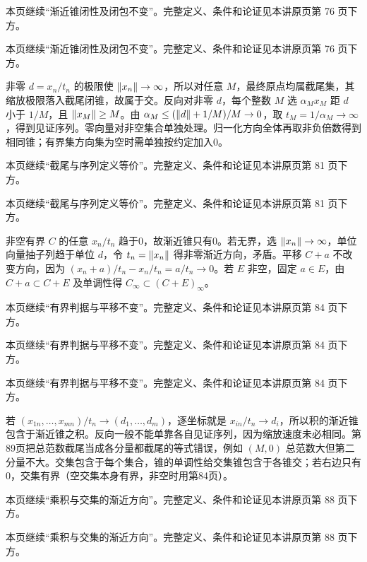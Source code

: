 本页继续“渐近锥闭性及闭包不变”。完整定义、条件和论证见本讲原页第 76 页下方。

本页继续“渐近锥闭性及闭包不变”。完整定义、条件和论证见本讲原页第 76 页下方。

非零 $d=x_n/t_n$ 的极限使 $\left\lVert x_n\right\rVert\to\infty$，所以对任意 $M$，最终原点均属截尾集，其缩放极限落入截尾闭锥，故属于交。反向对非零 $d$，每个整数 $M$ 选 $\alpha_M x_M$ 距 $d$ 小于 $1/M$，且 $\left\lVert x_M\right\rVert\ge M$。由 $\alpha_M\le(\left\lVert d\right\rVert+1/M)/M\to0$，取 $t_M=1/\alpha_M\to\infty$，得到见证序列。零向量对非空集合单独处理。归一化方向全体再取非负倍数得到相同锥；有界集方向集为空时需单独按约定加入0。

本页继续“截尾与序列定义等价”。完整定义、条件和论证见本讲原页第 81 页下方。

本页继续“截尾与序列定义等价”。完整定义、条件和论证见本讲原页第 81 页下方。

非空有界 $C$ 的任意 $x_n/t_n$ 趋于0，故渐近锥只有0。若无界，选 $\left\lVert x_n\right\rVert\to\infty$，单位向量抽子列趋于单位 $d$，令 $t_n=\left\lVert x_n\right\rVert$ 得非零渐近方向，矛盾。平移 $C+a$ 不改变方向，因为 $(x_n+a)/t_n-x_n/t_n=a/t_n\to0$。若 $E$ 非空，固定 $a\in E$，由 $C+a\subset C+E$ 及单调性得 $C_\infty\subset(C+E)_\infty$。

本页继续“有界判据与平移不变”。完整定义、条件和论证见本讲原页第 84 页下方。

本页继续“有界判据与平移不变”。完整定义、条件和论证见本讲原页第 84 页下方。

本页继续“有界判据与平移不变”。完整定义、条件和论证见本讲原页第 84 页下方。

若 $(x_{1n},\ldots,x_{mn})/t_n\to(d_1,\ldots,d_m)$，逐坐标就是 $x_{in}/t_n\to d_i$，所以积的渐近锥包含于渐近锥之积。反向一般不能单靠各自见证序列，因为缩放速度未必相同。第89页把总范数截尾当成各分量都截尾的等式错误，例如 $(M,0)$ 总范数大但第二分量不大。交集包含于每个集合，锥的单调性给交集锥包含于各锥交；若右边只有0，交集有界（空交集本身有界，非空时用第84页）。

本页继续“乘积与交集的渐近方向”。完整定义、条件和论证见本讲原页第 88 页下方。

本页继续“乘积与交集的渐近方向”。完整定义、条件和论证见本讲原页第 88 页下方。


